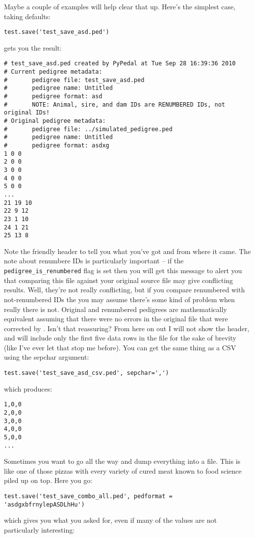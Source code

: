 Maybe a couple of examples will help clear that up. Here's the simplest case, taking defaults:
\begin{verbatim}
test.save('test_save_asd.ped')
\end{verbatim}
gets you the result:
\begin{verbatim}
# test_save_asd.ped created by PyPedal at Tue Sep 28 16:39:36 2010
# Current pedigree metadata:
#       pedigree file: test_save_asd.ped
#       pedigree name: Untitled
#       pedigree format: asd
#       NOTE: Animal, sire, and dam IDs are RENUMBERED IDs, not original IDs!
# Original pedigree metadata:
#       pedigree file: ../simulated_pedigree.ped
#       pedigree name: Untitled
#       pedigree format: asdxg
1 0 0
2 0 0
3 0 0
4 0 0
5 0 0
...
21 19 10
22 9 12
23 1 10
24 1 21
25 13 8
\end{verbatim}
Note the friendly header to tell you what you've got and from where it came. The note about renumbere IDs is particularly important -- if
the \texttt{pedigree\_is\_renumbered} flag is set then you will get this message to alert you that comparing this file against your original
source file may give conflicting results. Well, they're not really conflicting, but if you compare renumbered with not-renumbered IDs the
you may assume there's some kind of problem when really there is not. Original and renumbered pedigrees are mathematically equivalent assuming
that there were no errors in the original file that were corrected by \PyPedal{}. Isn't that reassuring? From here on out I will not show the
header, and will include only the first five data rows in the file for the sake of brevity (like I've ever let that stop me before). You can get
the same thing as a CSV using the sepchar argument:
\begin{verbatim}
test.save('test_save_asd_csv.ped', sepchar=',')
\end{verbatim}
which produces:
\begin{verbatim}
1,0,0
2,0,0
3,0,0
4,0,0
5,0,0
...
\end{verbatim}
Sometimes you want to go all the way and dump everything into a file. This is like one of those pizzas with every variety of cured meat known to
food science piled up on top. Here you go:
\begin{verbatim}
test.save('test_save_combo_all.ped', pedformat = 'asdgxbfrnylepASDLhHu')
\end{verbatim}
which gives you what you asked for, even if many of the values are not particularly interesting:

